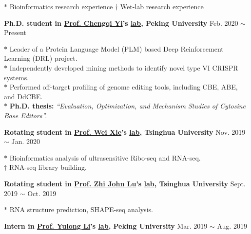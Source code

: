 
\small
$*$ Bioinformatics research experience \hspace{2em} $\dagger$ Wet-lab research experience

\normalsize
\vspace{10pt}

\textbf{Ph.D. student in \href{https://www.bio.pku.edu.cn/enhomes/news/teacher_dis/91.html}{Prof. Chengqi Yi}'s \href{https://yilab.org.cn/}{lab}, Peking University} \hfill Feb. 2020 $\sim$ Present

{\small
$*$ Leader of a Protein Language Model (PLM) based Deep Reinforcement Learning (DRL) project.\\
$*$ Independently developed mining methods to identify novel type VI CRISPR systems.\\
$*$ Performed off-target profiling of genome editing tools, including CBE, ABE, and DdCBE\cite{lei2022mitochondrial,rao2023characterizing,lei2021detect,lei2023detect}.\\
$*$ \textbf{Ph.D. thesis:} \textit{``Evaluation, Optimization, and Mechanism Studies of Cytosine Base Editors''.}
}

\vspace{5pt}

\textbf{Rotating student in \href{https://life.tsinghua.edu.cn/lifeen/info/1034/1077.htm}{Prof. Wei Xie}'s \href{http://www.xielab.org.cn/}{lab}, Tsinghua University} \hfill Nov. 2019 $\sim$ Jan. 2020

{\small
$*$ Bioinformatics analysis of ultrasensitive Ribo-seq and RNA-seq.\\
$\dagger$ RNA-seq library building.
}

\vspace{5pt}

\textbf{Rotating student in \href{https://life.tsinghua.edu.cn/lifeen/info/1034/1083.htm}{Prof. Zhi John Lu}'s \href{https://lulab.life.tsinghua.edu.cn/labhome/home/}{lab}, Tsinghua University} \hfill Sept. 2019 $\sim$ Oct. 2019

{\small
$*$ RNA structure prediction\cite{zhu2021integrative}, SHAPE-seq analysis.
}


\vspace{5pt}


\textbf{Intern in \href{https://www.bio.pku.edu.cn/enhomes/news/teacher_dis/43.html}{Prof. Yulong Li}'s \href{http://www.yulonglilab.org/}{lab}, Peking University} \hfill Mar. 2019 $\sim$ Aug. 2019

